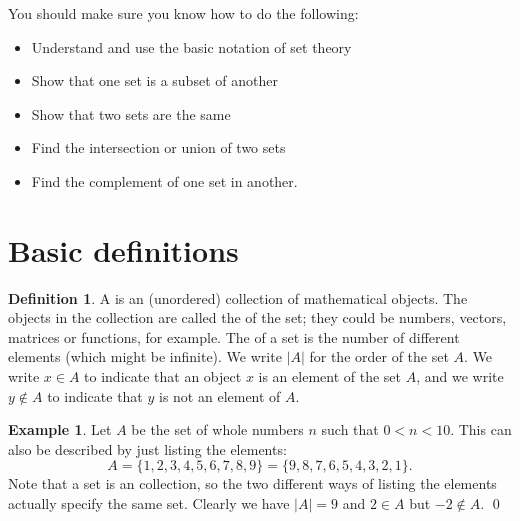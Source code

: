 \documentclass[a4paper]{book}
\theoremstyle{definition}
\newtheorem{definition}[theorem]{Definition}
\newtheorem{example}[theorem]{Example}
\begin{document}

You should make sure you know how to do the following:
\begin{itemize}
 \item Understand and use the basic notation of set theory
 \item Show that one set is a subset of another
 \item Show that two sets are the same
 \item Find the intersection or union of two sets
 \item Find the complement of one set in another.
\end{itemize}

\section{Basic definitions}
\label{sec-sets-basic}

\begin{definition}
 A  is an (unordered) collection of mathematical objects.
 The objects in the collection are called the  of the
 set; they could be numbers, vectors, matrices or functions, for
 example.  The  of a set is the number of different
 elements (which might be infinite).  We write $|A|$ for the order of
 the set $A$.  We write $x\in A$ to indicate that an object $x$ is an
 element of the set $A$, and we write $y\not\in A$ to indicate that
 $y$ is not an element of $A$.
\end{definition}

\begin{example}
 Let $A$ be the set of whole numbers $n$ such that $0<n<10$.  This can
 also be described by just listing the elements:
 \[ A = \{1,2,3,4,5,6,7,8,9\} = \{9,8,7,6,5,4,3,2,1\}. \]
 Note that a set is an  collection, so the two
 different ways of listing the elements actually specify the same set.
 Clearly we have $|A|=9$ and $2\in A$ but $-2\not\in A$. \qed
\end{example}
\end{document}
